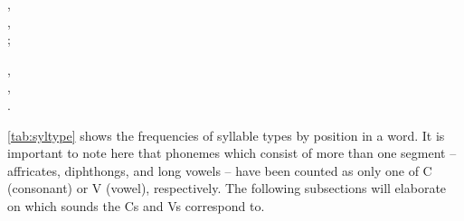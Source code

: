 	\a {},\\
		,\\
		;
		
	\a {},\\
		,\\
		.
\xe

\autoref{tab:syltype} shows the frequencies of syllable types by position in a 
word. It is important to note here that phonemes which consist of more than one 
segment -- affricates, diphthongs, and long vowels -- have been counted as only 
one of C (consonant) or V (vowel), respectively. The following subsections will 
elaborate on which sounds the Cs and Vs correspond to.


